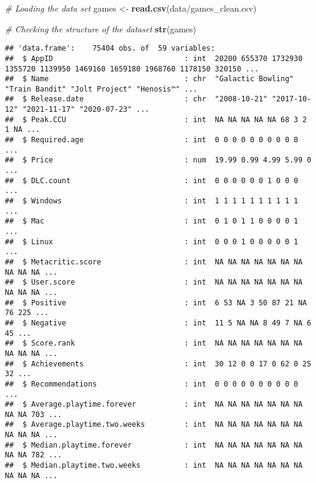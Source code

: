 \documentclass[
]{article}
\author{}
\date{\vspace{-2.5em}}
\newenvironment{Shaded}{\begin{snugshade}}{\end{snugshade}}
\newcommand{\CommentTok}[1]{\textcolor[rgb]{0.56,0.35,0.01}{\textit{#1}}}
\newcommand{\FunctionTok}[1]{\textcolor[rgb]{0.13,0.29,0.53}{\textbf{#1}}}
\newcommand{\NormalTok}[1]{#1}
\newcommand{\OtherTok}[1]{\textcolor[rgb]{0.56,0.35,0.01}{#1}}
\newcommand{\StringTok}[1]{\textcolor[rgb]{0.31,0.60,0.02}{#1}}
\begin{document}
\begin{Shaded}
\begin{Highlighting}[]
\CommentTok{\# Loading the data set}
\NormalTok{games }\OtherTok{\textless{}{-}} \FunctionTok{read.csv}\NormalTok{(}\StringTok{\textquotesingle{}data/games\_clean.csv\textquotesingle{}}\NormalTok{)}
\end{Highlighting}
\end{Shaded}

\begin{Shaded}
\begin{Highlighting}[]
\CommentTok{\# Checking the structure of the dataset}
\FunctionTok{str}\NormalTok{(games)}
\end{Highlighting}
\end{Shaded}

\begin{verbatim}
## 'data.frame':    75404 obs. of  59 variables:
##  $ AppID                              : int  20200 655370 1732930 1355720 1139950 1469160 1659180 1968760 1178150 320150 ...
##  $ Name                               : chr  "Galactic Bowling" "Train Bandit" "Jolt Project" "Henosis™" ...
##  $ Release.date                       : chr  "2008-10-21" "2017-10-12" "2021-11-17" "2020-07-23" ...
##  $ Peak.CCU                           : int  NA NA NA NA NA 68 3 2 1 NA ...
##  $ Required.age                       : int  0 0 0 0 0 0 0 0 0 0 ...
##  $ Price                              : num  19.99 0.99 4.99 5.99 0 ...
##  $ DLC.count                          : int  0 0 0 0 0 0 1 0 0 0 ...
##  $ Windows                            : int  1 1 1 1 1 1 1 1 1 1 ...
##  $ Mac                                : int  0 1 0 1 1 0 0 0 0 1 ...
##  $ Linux                              : int  0 0 0 1 0 0 0 0 0 1 ...
##  $ Metacritic.score                   : int  NA NA NA NA NA NA NA NA NA NA ...
##  $ User.score                         : int  NA NA NA NA NA NA NA NA NA NA ...
##  $ Positive                           : int  6 53 NA 3 50 87 21 NA 76 225 ...
##  $ Negative                           : int  11 5 NA NA 8 49 7 NA 6 45 ...
##  $ Score.rank                         : int  NA NA NA NA NA NA NA NA NA NA ...
##  $ Achievements                       : int  30 12 0 0 17 0 62 0 25 32 ...
##  $ Recommendations                    : int  0 0 0 0 0 0 0 0 0 0 ...
##  $ Average.playtime.forever           : int  NA NA NA NA NA NA NA NA NA 703 ...
##  $ Average.playtime.two.weeks         : int  NA NA NA NA NA NA NA NA NA NA ...
##  $ Median.playtime.forever            : int  NA NA NA NA NA NA NA NA NA 782 ...
##  $ Median.playtime.two.weeks          : int  NA NA NA NA NA NA NA NA NA NA ...

\end{verbatim}
\end{document}
